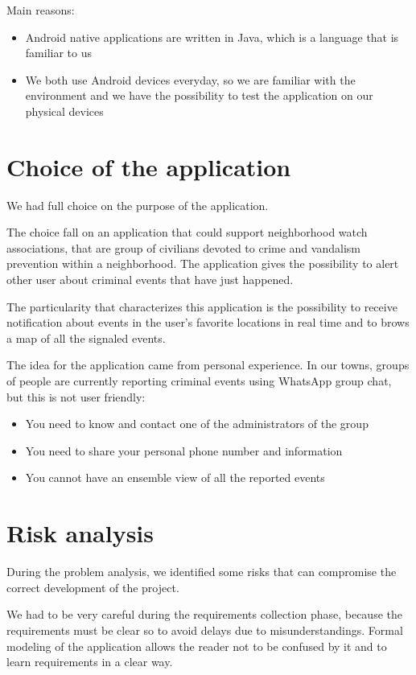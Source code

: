 \documentclass[a4paper]{scrreprt}
\begin{document}
\bigskip \noindent Main reasons:
\begin{itemize}
\item Android native applications are written in Java, which is a language that is familiar to us
\item We both use Android devices everyday, so we are familiar with the environment and we have the possibility to test the application on our physical devices
\end{itemize}

\section{Choice of the application}
We had full choice on the purpose of the application.

\bigskip The choice fall on an application that could support neighborhood watch associations, that are group of civilians devoted to crime and vandalism prevention within a neighborhood. The application gives the possibility to alert other user about criminal events that have just happened.

The particularity that characterizes this application is the possibility to receive notification about events in the user's favorite locations in real time and to brows a map of all the signaled events.

\bigskip The idea for the application came from personal experience. In our towns, groups of people are currently reporting criminal events using WhatsApp group chat, but this is not user friendly:
\begin{itemize}
\item You need to know and contact one of the administrators of the group
\item You need to share your personal phone number and information
\item You cannot have an ensemble view of all the reported events
\end{itemize}

\section{Risk analysis}
During the problem analysis, we identified some risks that can compromise the correct development of the project.

\bigskip We had to be very careful during the requirements collection phase, because the requirements must be clear so to avoid delays due to misunderstandings. Formal modeling of the application allows the reader not to be confused by it and to learn requirements in a clear way.
\end{document}
